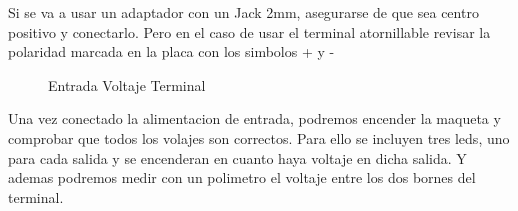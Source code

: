 \documentclass{DccDiyTools}
\begin{document}
Si se va a usar un adaptador con un Jack 2mm, asegurarse de que sea centro positivo y conectarlo.
Pero en el caso de usar el terminal atornillable revisar la polaridad marcada en la placa con los simbolos + y -
\begin{figure}[H]
\centering
{}
\caption{Entrada Voltaje Terminal}
\label{fig:VccInTerminal2}
\end{figure}


Una vez conectado la alimentacion de entrada, podremos encender la maqueta y comprobar que todos los volajes
son correctos. Para ello se incluyen tres leds, uno para cada salida y se encenderan en cuanto haya voltaje
en dicha salida. Y ademas podremos medir con un polimetro
el voltaje entre los dos bornes del terminal.
\end{document}
